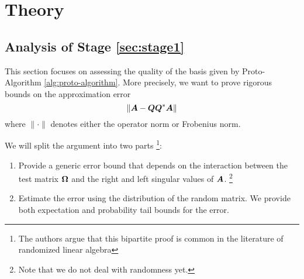 \section*{Theory}
\subsection{Analysis of Stage \ref{sec:stage1}} 
This section focuses on assessing the quality of the basis given
by Proto-Algorithm \ref{alg:proto-algorithm}. More precisely, we want to prove rigorous bounds on the
approximation error
$$ \|\bm{A}-\bm{Q}\bm{Q}^*\bm{A}\| $$
where $\|\cdot\|$ denotes either the operator norm or Frobenius norm.

We will split the argument into two parts \footnote{The authors
argue that this bipartite proof
is common in the literature of randomized linear algebra}:
\begin{enumerate}
  \item Provide a generic error bound that depends on the interaction
  between the test matrix $\bm{\Omega}$ and the right and left
  singular values of $\bm{A}$. \footnote{Note that we do not deal
  with randomness yet.} 
  \item Estimate the error using the distribution of the random matrix.
  We provide both expectation and probability tail bounds for the error.
\end{enumerate}

